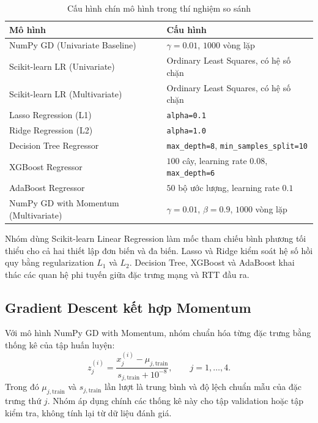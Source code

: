 \begin{table}[H]
    \centering
    \caption{Cấu hình chín mô hình trong thí nghiệm so sánh}
    \label{tab:improvement-configurations}
    \small
    \begin{tabular}{p{}p{}}
        \toprule
        \textbf{Mô hình} & \textbf{Cấu hình} \\
        \midrule
        NumPy GD (Univariate Baseline)
        & $\gamma=0.01$, $1000$ vòng lặp \\
        Scikit-learn LR (Univariate)
        & Ordinary Least Squares, có hệ số chặn \\
        Scikit-learn LR (Multivariate)
        & Ordinary Least Squares, có hệ số chặn \\
        Lasso Regression (L1)
        & \texttt{alpha=0.1} \\
        Ridge Regression (L2)
        & \texttt{alpha=1.0} \\
        Decision Tree Regressor
        & \texttt{max\_depth=8}, \texttt{min\_samples\_split=10} \\
        XGBoost Regressor
        & $100$ cây, learning rate $0.08$, \texttt{max\_depth=6} \\
        AdaBoost Regressor
        & $50$ bộ ước lượng, learning rate $0.1$ \\
        NumPy GD with Momentum (Multivariate)
        & $\gamma=0.01$, $\beta=0.9$, $1000$ vòng lặp \\
        \bottomrule
    \end{tabular}
\end{table}

Nhóm dùng Scikit-learn Linear Regression làm mốc tham chiếu
bình phương tối thiểu cho cả hai thiết lập đơn biến và đa biến.
Lasso và Ridge kiểm soát hệ số hồi quy bằng regularization
$L_1$ và $L_2$. Decision Tree, XGBoost và AdaBoost khai thác
các quan hệ phi tuyến giữa đặc trưng mạng và RTT đầu ra.

\subsection{Gradient Descent kết hợp Momentum}

Với mô hình NumPy GD with Momentum, nhóm chuẩn hóa từng
đặc trưng bằng thống kê của tập huấn luyện:
\[
    z_j^{(i)} =
    \frac{x_j^{(i)}-\mu_{j,\mathrm{train}}}
         {s_{j,\mathrm{train}}+10^{-8}},\qquad j=1,\ldots,4.
\]
Trong đó $\mu_{j,\mathrm{train}}$ và $s_{j,\mathrm{train}}$
lần lượt là trung bình và độ lệch chuẩn mẫu của đặc trưng
thứ $j$. Nhóm áp dụng chính các thống kê này cho tập validation
hoặc tập kiểm tra, không tính lại từ dữ liệu đánh giá.

